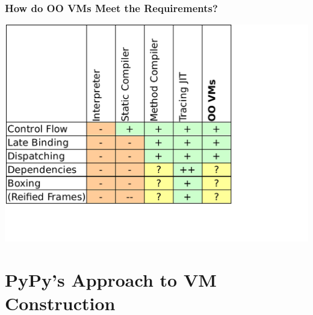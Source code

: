 \documentclass[utf8x]{beamer}
\begin{document}
\begin{frame}
  \frametitle{How do OO VMs Meet the Requirements?}
  \includegraphics[scale=0.6]{figures/output5.pdf}
\end{frame}

\section{PyPy's Approach to VM Construction}
\end{document}
